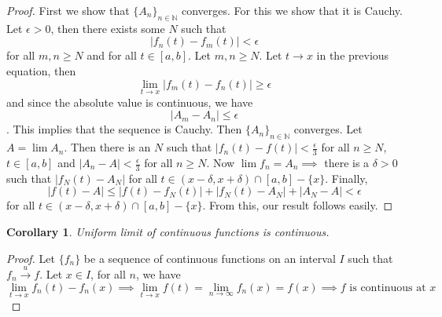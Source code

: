 \documentclass{article}
\newtheorem{corollary}{Corollary}
\begin{document}
\begin{proof}
    First we show that $\{A_n\}_{n\in\mathbb{N}}$ converges. For this we show that it is Cauchy. Let $\epsilon>0$, then there exists some $N$ such that $$|f_n(t)-f_m(t)|<\epsilon$$ for all $m,n\geq N$ and for all $t\in [a,b]$. Let $m,n\geq N$. Let $t\to x$ in the previous equation, then
    $$\lim_{t\to x}|f_m(t)-f_n(t)|\geq \epsilon$$ and since the absolute value is continuous, we have $$|A_m-A_n|\leq \epsilon$$. This implies that the sequence is Cauchy. Then $\{A_n\}_{n\in\mathbb{N}}$ converges.
Let $A=\lim A_n$. Then there is an $N$ such that $|f_n(t)-f(t)|<\frac{\epsilon}{3}$ for all $n\geq N$, $t\in[a,b]$ and $|A_n-A|<\frac{\epsilon}{3}$ for all $n\geq N$. Now $\lim f_n=A_n\implies$ there is a $\delta>0$ such that $|f_N(t)-A_N|$ for all $t\in (x-\delta,x+\delta)\cap [a,b]-\{x\}$. 
Finally,
$$|f(t)-A|\leq |f(t)-f_{N}(t)|+|f_{N}(t)-A_N|+|A_N-A|<\epsilon$$ for all $t\in(x-\delta,x+\delta)\cap [a,b]-\{x\}$.
From this, our result follows easily.
\end{proof}
\begin{corollary}
    Uniform limit of continuous functions is continuous.
\end{corollary}
\begin{proof}
    Let $\{f_n\}$ be a sequence of continuous functions on an interval $I$ such that $f_n\xrightarrow{u}f$. Let $x\in I$, for all $n$, we have
    $$\lim_{t\to x}f_n(t)-f_n(x)\implies \lim_{t\to x}f(t)=\lim_{n\to \infty}f_n(x)=f(x)\implies f\text{ is continuous at }x$$
\end{proof}
\end{document}
